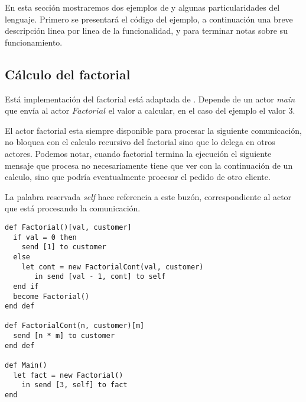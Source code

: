 En esta sección mostraremos dos ejemplos de \SAL y algunas particularidades del lenguaje. Primero se presentará el código del ejemplo, a continuación una breve descripción linea por linea de la funcionalidad, y para terminar notas sobre su funcionamiento.

\subsection{Cálculo del factorial}\label{sal:factorial}

Está implementación del factorial está adaptada de \cite{Agha:1986:AMC:7929}. Depende de un actor \textit{main} que envía al actor $Factorial$ el valor a calcular, en el caso del ejemplo el valor $3$.

El actor factorial esta siempre disponible para procesar la siguiente comunicación, no bloquea con el calculo recursivo del factorial sino que lo delega en otros actores. Podemos notar, cuando factorial termina la ejecución el siguiente mensaje que procesa no necesariamente tiene que ver con la continuación de un calculo, sino que podría eventualmente procesar el pedido de otro cliente.

La palabra reservada \textit{self} hace referencia a este buzón, correspondiente al actor que está procesando la comunicación.

\begin{lstlisting}[language=sal, style=simple]
def Factorial()[val, customer]
  if val = 0 then
    send [1] to customer
  else
    let cont = new FactorialCont(val, customer)
       in send [val - 1, cont] to self
  end if 
  become Factorial()
end def

def FactorialCont(n, customer)[m] 
  send [n * m] to customer
end def

def Main() 
  let fact = new Factorial() 
    in send [3, self] to fact
end
\end{lstlisting}

